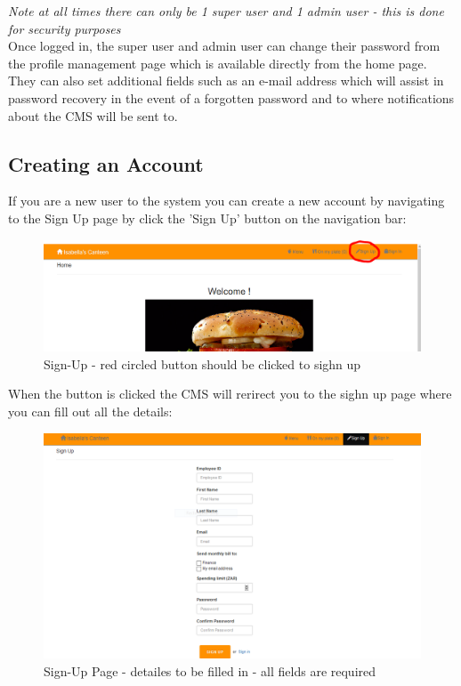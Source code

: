 \documentclass[a4paper,12pt]{article}
\begin{document}
{\em* Note at all times there can only be 1 super user and 1 admin user - this is done for security purposes  } \\

Once logged in, the super user and admin user can change their password from the profile management page which is available directly from the home page. They can also set additional fields such as an e-mail address which will assist in password recovery in the event of a forgotten password and to where notifications about the CMS will be sent to.\\

\subsection{Creating an Account}
If you are a new user to the system you can create a new account by navigating to the Sign Up page by click the 'Sign Up' button on the navigation bar:

\begin{figure}[H]
  \centering
    \includegraphics[width=1.0\textwidth]{screenshots/sighnUp.png}
    \caption{Sign-Up - red circled button should be clicked to sighn up} 
\end{figure}

When the button is clicked the CMS will rerirect you to the sighn up page where you can fill out all the details: \\

\begin{figure}[H]
  \centering
    \includegraphics[width=1.0\textwidth]{screenshots/sighnUpPage.png}
    \caption{Sign-Up Page - detailes to be filled in - all fields are required} 
\end{figure}
\end{document}
